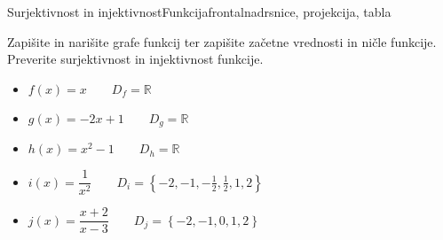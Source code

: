 \begin{priprava}{4}{}{Surjektivnost in injektivnost}{Funkcija}{frontalna}{drsnice, projekcija, tabla}
            \begin{naloga}
                Zapišite in narišite grafe funkcij ter zapišite začetne vrednosti in ničle funkcije.
                Preverite surjektivnost in injektivnost funkcije.
                    \begin{itemize}
                        \item $f(x)=x \quad \quad D_f=\mathbb{R}$ 
                        \item $g(x)=-2x+1 \quad \quad D_g=\mathbb{R}$ 
                        \item $h(x)=x^2-1 \quad \quad D_h=\mathbb{R}$ 
                        \item $i(x)=\dfrac{1}{x^2} \quad \quad D_i=\left\{-2, -1, -\frac{1}{2}, \frac{1}{2}, 1, 2\right\}$ 
                        \item $j(x)=\dfrac{x+2}{x-3} \quad \quad D_j=\left\{-2, -1, 0, 1, 2\right\}$ 
                    \end{itemize}
            \end{naloga}                    




\end{priprava}